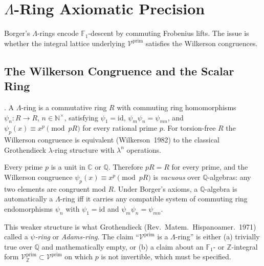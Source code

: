 \chapter{\(\Lambda\)-Ring Axiomatic Precision}
\label{v4-arith:gelfand-borger}

Borger's \(\Lambda\)-rings encode \(\mathbb F_1\)-descent by commuting
Frobenius lifts. The issue is whether the integral lattice underlying
\(\mathcal V^{\mathrm{prim}}\) satisfies the Wilkerson congruences.

\section{The Wilkerson Congruence and the Scalar Ring}
\label{v4-arith:gb:wilkerson}

\begin{theorem}
\label{v4-arith:thm:wilkerson}
\ClaimStatusProvedElsewhere. A \(\Lambda\)-ring is a commutative
ring \(R\) with commuting ring homomorphisms
\(\psi_{n}\colon R\to R\), \(n\in\mathbb{N}^{\times}\), satisfying
\(\psi_{1}=\mathrm{id}\), \(\psi_{m}\psi_{n}=\psi_{mn}\), and
\(\psi_{p}(x)\equiv x^{p}\pmod{pR}\) for every rational prime \(p\).
For torsion-free \(R\) the Wilkerson congruence is equivalent
(Wilkerson~1982) to the classical Grothendieck \(\lambda\)-ring
structure with \(\lambda^{n}\) operations.
\end{theorem}

\begin{observation}
\label{v4-arith:obs:vacuous-over-Q}
Every prime \(p\) is a unit in \(\mathbb{C}\) or \(\mathbb{Q}\).
Therefore \(pR=R\) for every prime, and the Wilkerson congruence
\(\psi_{p}(x)\equiv x^{p}\pmod{pR}\) is \emph{vacuous} over
\(\mathbb{Q}\)-algebras: any two elements are congruent mod \(R\).
Under Borger's axioms, a \(\mathbb{Q}\)-algebra is automatically a
\(\Lambda\)-ring iff it carries any compatible system of commuting
ring endomorphisms \(\psi_{n}\) with \(\psi_{1}=\mathrm{id}\) and
\(\psi_{m}\psi_{n}=\psi_{mn}\).
\end{observation}

\begin{remark}
This weaker structure is what Grothendieck (Rev.~Matem.~Hispanoamer.~1971)
called a \emph{\(\psi\)-ring} or \emph{Adams-ring}. The claim
``\(\mathcal{V}^{\mathrm{prim}}\) is a \(\Lambda\)-ring'' is either
(a) trivially true over \(\mathbb{Q}\) and mathematically empty, or
(b) a claim about an \(\mathbb{F}_{1}\)- or \(\mathbb{Z}\)-integral form
\(\mathcal{V}^{\mathrm{prim}}_{\mathbb{Z}}\subset\mathcal{V}^{\mathrm{prim}}\)
on which \(p\) is not invertible, which must be specified.
\end{remark}

